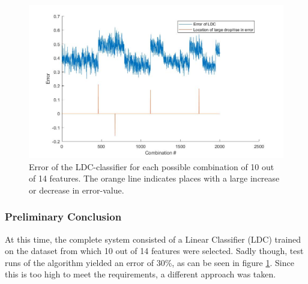 \begin{figure}[H]
	\centering
	\includegraphics[scale=0.45]{images/feat_jumps.jpg}
	\caption{Error of the LDC-classifier for each possible combination of 10 out of 14 features. The orange line indicates places with a large increase or decrease in error-value.}
	\label{fig:feat_jumps}
\end{figure}

\subsubsection*{Preliminary Conclusion}
\noindent At this time, the complete system consisted of a Linear Classifier (LDC) trained on the dataset from which 10 out of 14 features were selected. Sadly though, test runs of the algorithm yielded an error of 30\%, as can be seen in figure \ref{fig:feat_jumps}. Since this is too high to meet the requirements, a different approach was taken. \\

